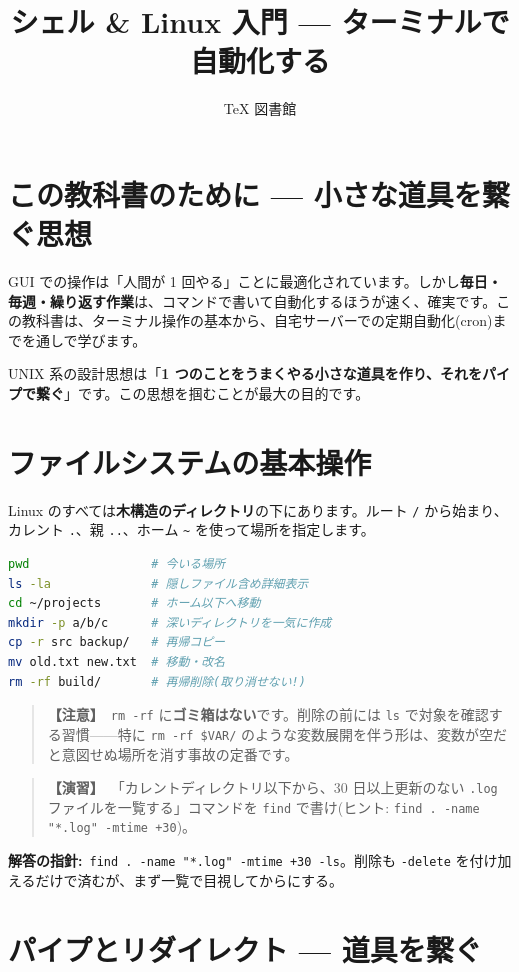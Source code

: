 \documentclass{article}
\title{シェル \& Linux 入門 — ターミナルで自動化する}
\author{TeX 図書館}
\begin{document}
\section{この教科書のために — 小さな道具を繋ぐ思想}

GUI での操作は「人間が 1 回やる」ことに最適化されています。しかし\textbf{毎日・毎週・繰り返す作業}は、コマンドで書いて自動化するほうが速く、確実です。この教科書は、ターミナル操作の基本から、自宅サーバーでの定期自動化(cron)までを通しで学びます。

UNIX 系の設計思想は「\textbf{1 つのことをうまくやる小さな道具を作り、それをパイプで繋ぐ}」です。この思想を掴むことが最大の目的です。

\section{ファイルシステムの基本操作}

Linux のすべては\textbf{木構造のディレクトリ}の下にあります。ルート \texttt{/} から始まり、カレント \texttt{.}、親 \texttt{..}、ホーム \texttt{\textasciitilde} を使って場所を指定します。

\begin{lstlisting}[language=bash]
pwd                 # 今いる場所
ls -la              # 隠しファイル含め詳細表示
cd ~/projects       # ホーム以下へ移動
mkdir -p a/b/c      # 深いディレクトリを一気に作成
cp -r src backup/   # 再帰コピー
mv old.txt new.txt  # 移動・改名
rm -rf build/       # 再帰削除(取り消せない!)
\end{lstlisting}

\begin{quote}
\textbf{【注意】}\ \texttt{rm -rf} に\textbf{ゴミ箱はない}です。削除の前には \texttt{ls} で対象を確認する習慣——特に \texttt{rm -rf \$VAR/} のような変数展開を伴う形は、変数が空だと意図せぬ場所を消す事故の定番です。
\end{quote}

\begin{quote}
\textbf{【演習】}\ 「カレントディレクトリ以下から、30 日以上更新のない \texttt{.log} ファイルを一覧する」コマンドを \texttt{find} で書け(ヒント: \texttt{find . -name "*.log" -mtime +30})。
\end{quote}

\textbf{解答の指針:}\ \texttt{find . -name "*.log" -mtime +30 -ls}。削除も \texttt{-delete} を付け加えるだけで済むが、まず一覧で目視してからにする。

\section{パイプとリダイレクト — 道具を繋ぐ}
\end{document}
